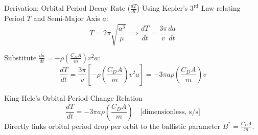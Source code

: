 \documentclass[aspectratio=169,11pt]{beamer}
\begin{document}
\begin{frame}{Derivation: Orbital Period Decay Rate ($\frac{dT}{dt}$)}
    Using Kepler's $3^{\text{rd}}$ Law relating Period $T$ and Semi-Major Axis $a$:
    \begin{equation*}
        T = 2\pi \sqrt{\frac{a^3}{\mu}} \implies \frac{dT}{dt} = \frac{3\pi}{v} \frac{da}{dt}
    \end{equation*}

    Substitute $\frac{da}{dt} = -\rho \left(\frac{C_D A}{m}\right) v^2 a$:
    \begin{equation*}
        \frac{dT}{dt} = \frac{3\pi}{v} \left[ -\rho \left(\frac{C_D A}{m}\right) v^2 a \right] = -3\pi a \rho \left(\frac{C_D A}{m}\right) v
    \end{equation*}

    \begin{alertblock}{King-Hele's Orbital Period Change Relation}
        \begin{equation*}
            \frac{dT}{dt} = -3\pi a \rho \left(\frac{C_D A}{m}\right) \quad \text{[dimensionless, s/s]}
        \end{equation*}
        Directly links orbital period drop per orbit to the ballistic parameter $B^* = \frac{C_D A}{m}$.
    \end{alertblock}
\end{frame}
\end{document}
